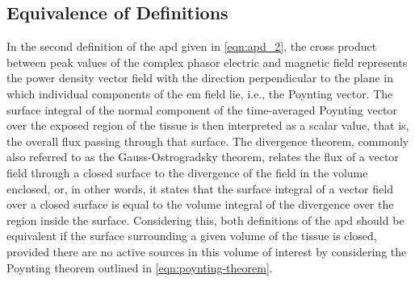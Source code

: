 \subsection{Equivalence of Definitions}
In the second definition of the \gls{apd} given in \cref{eqn:apd_2}, the cross product between peak values of the complex phasor electric and magnetic field represents the power density vector field with the direction perpendicular to the plane in which individual components of the \gls{em} field lie, i.e., the Poynting vector.
The surface integral of the normal component of the time-averaged Poynting vector over the exposed region of the tissue is then interpreted as a scalar value, that is, the overall flux passing through that surface.
The divergence theorem, commonly also referred to as the Gauss-Ostrogradsky theorem, relates the flux of a vector field through a closed surface to the divergence of the field in the volume enclosed, or, in other words, it states that the surface integral of a vector field over a closed surface is equal to the volume integral of the divergence over the region inside the surface.
Considering this, both definitions of the \gls{apd} should be equivalent if the surface surrounding a given volume of the tissue is closed, provided there are no active sources in this volume of interest by considering the Poynting theorem outlined in \cref{eqn:poynting-theorem}.

